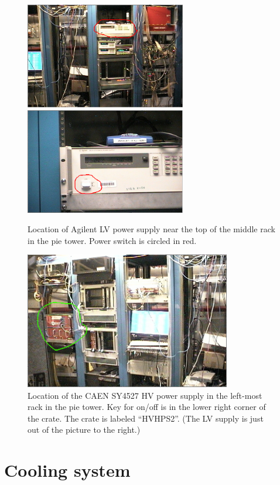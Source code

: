 \documentclass[12pt]{article}
\begin{document}
{\begin{figure}[htbp]\centering
    \includegraphics[width=7cm]{pics/ECALLVPHOTO2.png}
    \includegraphics[width=7cm]{pics/ECALLVPHOTO.png}
    \caption{Location of Agilent LV power supply near the top of the middle rack in the pie tower.  Power switch is circled in red.\label{fig:LVPHOTO}}
\end{figure}
\begin{figure}[htbp]\centering
    \includegraphics[width=9cm]{pics/ECALHVPHOTO.png}
    \caption{Location of the CAEN SY4527 HV power supply in the left-most rack in the pie tower.  Key for on/off is in the lower right corner of the crate.  The crate is labeled ``HVHPS2''. (The LV supply is just out of the picture to the right.)\label{fig:HVPHOTO}}
\end{figure}

\newpage
   \section{Cooling system}

}
\end{document}
